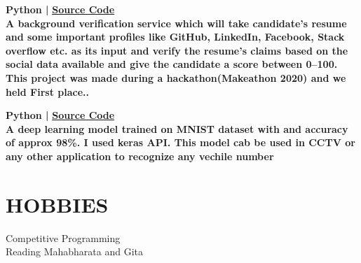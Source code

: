 \documentclass[]{deedy-resume-openfont}
\begin{document}
\begin{minipage}[t]{0.66\textwidth}
\textbf{Python | } \textbf{\href{https://github.com/divakar-lakhera/Makeathon2020}{Source Code}} \\  
\textbf{A background verification service which will take candidate’s resume and some important profiles like GitHub, LinkedIn, Facebook, Stack overflow etc. as its input and
verify the resume’s claims based on the social data available and give the candidate a
score between 0–100.
This project was made during a hackathon(Makeathon 2020) and we held First place..}
\sectionsep

\textbf{Python | } \textbf{\href{https://github.com/Pankajcoder1/machine_learning_and_more../tree/master/mnist}{Source Code}} \\ 
\textbf{A deep learning model trained on MNIST dataset with and accuracy of approx 98\%. I used keras API. This model cab be used in CCTV or any other application to recognize any vechile number}
\sectionsep



\section{HOBBIES}
\textbullet{} Competitive Programming \\
\textbullet{} Reading Mahabharata and Gita \\



% 
% 

\end{minipage} 
\end{document}
